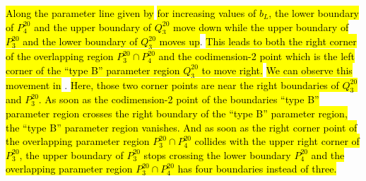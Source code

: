 \hl{Along the parameter line given by}  \hl{for increasing values of $b_L$, the lower boundary of $P^{20}_4$ and the upper boundary of $Q^{20}_3$ move down while the upper boundary of $P^{20}_3$ and the lower boundary of $Q^{20}_3$ moves up}.
\hl{
	This leads to both the right corner of the overlapping region $P^{20}_3 \cap P^{20}_4$ and the codimension-2 point which is the left corner of the ``type B'' parameter region $Q^{20}_3$ to move right.
}
\hl{We can observe this movement in} .
\hl{
	Here, those two corner points are near the right boundaries of $Q^{20}_3$ and $P^{20}_3$.
	As soon as the codimension-2 point of the boundaries ``type B'' parameter region crosses the right boundary of the ``type B'' parameter region, the ``type B'' parameter region vanishes.
	And as soon as the right corner point of the overlapping parameter region $P^{20}_3 \cap P^{20}_4$ collides with the upper right corner of $P^{20}_3$, the upper boundary of $P^{20}_3$ stops crossing the lower boundary $P^{20}_4$ and the overlapping parameter region $P^{20}_3 \cap P^{20}_4$ has four boundaries instead of three.
}
